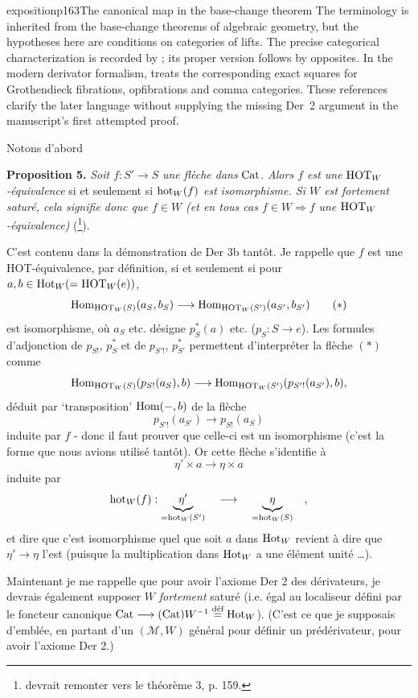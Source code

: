 \begin{dcomment}{exposition}{p163}{The canonical map in the base-change theorem}
The terminology is inherited from the base-change theorems of algebraic geometry, but the hypotheses here are conditions on categories of lifts. The precise categorical characterization is recorded by \citet[Theorem~1.2]{Maltsiniotis2005Asphericite}; its proper version follows by opposites. In the modern derivator formalism, \citet[Propositions~1.24 and~1.26]{Groth2013} treats the corresponding exact squares for Grothendieck fibrations, opfibrations and comma categories. These references clarify the later language without supplying the missing Der~2 argument in the manuscript's first attempted proof.
\end{dcomment}


\noindent{}%
Notons d'abord

\noindent\textbf{Proposition 5.} \textit{Soit} $f : S' \longrightarrow S$ \textit{une flèche dans} $\mathrm{Cat}$. \textit{Alors $f$ est une} $\mathrm{HOT}_W$\textit{-équivalence} si et seulement si $\mathrm{hot}_W(f)$ \textit{est} \textit{isomorphisme. Si $W$ est fortement saturé, cela signifie donc que $f \in W$ (et en tous cas $f \in W \Longrightarrow f$} \textit{une} $\mathrm{HOT}_W$\textit{-équivalence)} (\footnote[81]{devrait remonter vers le théorème 3, p. 159.}).

C'est contenu dans la démonstration de Der 3b tantôt. Je rappelle que $f$ est une HOT-équivalence, par définition, si et seulement si pour $a, b \in \mathrm{Hot}_W (= \mathrm{HOT}_W(e))$,
\[
\Hom_{\HOT_W(S)}(a_S, b_S) \longrightarrow \Hom_{\HOT_W(S')}(a_{S'}, b_{S'}) \tag*{$(*)$}
\]
est isomorphisme, où $a_S$ etc. désigne $p_S^*(a)$ etc. ($p_S : S \longrightarrow e$). Les formules d'adjonction de $p_{S!}$, $p_S^*$ et de $p_{S'!}$, $p_{S'}^*$ permettent d'interpréter la flèche $(*)$ comme
\[
\mathrm{Hom}_{\mathrm{HOT}_W(S)}(p_{S!}(a_S), b) \longrightarrow \mathrm{Hom}_{\mathrm{HOT}_W(S')}(p_{S'!}(a_{S'}), b),
\]
déduit par ‘transposition’ $\mathrm{Hom}(-, b)$ de la flèche
\[
p_{S'!}(a_{S'}) \longrightarrow p_{S!}(a_S)
\]
induite par $f$ - donc il faut prouver que celle-ci est un isomorphisme (c'est la forme que nous avions utilisé tantôt). Or cette flèche s'identifie à
\[
\eta' \times a \longrightarrow \eta \times a
\]
induite par
\[
\mathrm{hot}_W(f) : \underbrace{\eta'}_{= \mathrm{hot}_W(S')} \quad \longrightarrow \quad \underbrace{\eta}_{= \mathrm{hot}_W(S)} \quad ,
\]
et dire que c'est isomorphisme quel que soit $a$ dans $\mathrm{Hot}_W$ revient à dire que $\eta' \longrightarrow \eta$ l'est (puisque la multiplication dans $\mathrm{Hot}_W$ a une élément unité \dots). %

Maintenant je me rappelle que pour avoir l'axiome Der 2 des dérivateurs, je devrais également supposer $W$ \textit{fortement} saturé (i.e. égal au localiseur défini par le foncteur canonique $\mathrm{Cat} \longrightarrow (\mathrm{Cat})W^{-1} \overset{\text{déf}}{=} \mathrm{Hot}_W$). (C'est ce que je supposais d'emblée, en partant d'un $(\mathcal{M}, W)$ général pour définir un prédérivateur, pour avoir l'axiome Der 2.)

